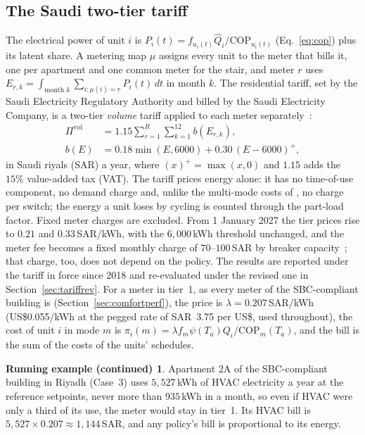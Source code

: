 \documentclass[10pt,a4paper,twocolumn]{article}
\theoremstyle{definition}
\newtheorem*{runexc}{Running example (continued)}
\newcommand{\exAptKwh}{5{,}527}
\newcommand{\exAptMaxMonth}{935}
\newcommand{\exAptBill}{1{,}144}
\begin{document}
\subsection{The Saudi two-tier tariff}\label{sec:tariff}
The electrical power of unit $i$ is $P_i(t)=f_{u_i(t)}\hat Q_i/\mathrm{COP}_{u_i(t)}$ (Eq.~\eqref{eq:cop}) plus its latent share. A metering map $\mu$ assigns every unit to the meter that bills it, one per apartment and one common meter for the stair, and meter $r$ uses $E_{r,k}=\int_{\text{month }k}\sum_{i:\mu(i)=r}P_i(t)\,dt$ in month $k$. The residential tariff, set by the Saudi Electricity Regulatory Authority and billed by the Saudi Electricity Company, is a two-tier \emph{volume} tariff applied to each meter separately~\citep{sec_tariff}:
\begin{subequations}\label{eq:tariff}
\begin{align}
\Pi^{\text{vol}}&=1.15\sum_{r=1}^{R}\sum_{k=1}^{12}b(E_{r,k}),\label{eq:tariff-a}\\
b(E)&=0.18\min(E,6000)+0.30\,(E-6000)^{+},\label{eq:tariff-b}
\end{align}
\end{subequations}
in Saudi riyals (SAR) a year, where $(x)^{+}=\max(x,0)$ and $1.15$ adds the $15\%$ value-added tax (VAT). The tariff prices energy alone: it has no time-of-use component, no demand charge and, unlike the multi-mode costs of \citet{mousa2017optimal}, no charge per switch; the energy a unit loses by cycling is counted through the part-load factor. Fixed meter charges are excluded. From 1 January 2027 the tier prices rise to $0.21$ and $0.33\,$SAR/kWh, with the $6{,}000\,$kWh threshold unchanged, and the meter fee becomes a fixed monthly charge of $70$--$100\,$SAR by breaker capacity~\citep{se_tariff2027}; that charge, too, does not depend on the policy. The results are reported under the tariff in force since 2018 and re-evaluated under the revised one in Section~\ref{sec:tariffrev}. For a meter in tier~1, as every meter of the SBC-compliant building is (Section~\ref{sec:comfortperf}), the price is $\lambda=0.207\,$SAR/kWh (US\$0.055/kWh at the pegged rate of SAR~3.75 per US\$, used throughout), the cost of unit $i$ in mode $m$ is $\pi_i(m)=\lambda f_m\psi(T_a)Q_i/\mathrm{COP}_m(T_a)$, and the bill is the sum of the costs of the units' schedules.

\begin{runexc}
Apartment 2A of the SBC-compliant building in Riyadh (Case~3) uses $\exAptKwh\,$kWh of HVAC electricity a year at the reference setpoints, never more than $\exAptMaxMonth\,$kWh in a month, so even if HVAC were only a third of its use, the meter would stay in tier~1. Its HVAC bill is $\exAptKwh\times0.207\approx\exAptBill\,$SAR, and any policy's bill is proportional to its energy.
\end{runexc}
\end{document}
